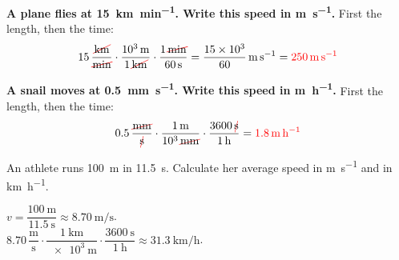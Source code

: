 \begin{example}
    \textbf{A plane flies at \qty{15}{\km\per\minute}. Write this speed in \unit{\m\per\s}.} First the length, then the time:
    \begin{equation*}
        \num{15}\,\dfrac{\cancelunit{\km}}{\cancelunit{\minute}} \cdot \dfrac{\qty{e3}{\m}}{1\,\cancelunit{\km}} \cdot \dfrac{1\,\cancelunit{\minute}}{\qty{60}{\s}} = \dfrac{\num{15e3}}{60}\,\unit{\m\per\s} = \textcolor{red}{\qty{250}{\m\per\s}}
    \end{equation*}
\end{example}

\begin{example}
    \textbf{A snail moves at \qty{0.5}{\mm\per\s}. Write this speed in \unit{\m\per\hour}.} First the length, then the time:
    \begin{equation*}
        \num{0.5}\,\dfrac{\cancelunit{\mm}}{\cancelunit{\s}} \cdot \dfrac{\qty{1}{\m}}{\num{e3}\,\cancelunit{\mm}} \cdot \dfrac{\num{3600}\,\cancelunit{\s}}{\qty{1}{\hour}} = \textcolor{red}{\qty{1.8}{\m\per\hour}}
    \end{equation*}
\end{example}

\begin{exercise}
    An athlete runs \qty{100}{\metre} in \qty{11.5}{\s}. Calculate her average speed in \unit{\m\per\s} and in \unit{\km\per\hour}.
    \begin{solu}
        \(v = \dfrac{\qty{100}{\m}}{\qty{11.5}{\s}} \approx \qty{8.70}{\m\per\s}\). \\
        \(\num{8.70}\,\dfrac{\unit{\m}}{\unit{\s}} \cdot \dfrac{\qty{1}{\km}}{\qty{e3}{\m}} \cdot \dfrac{\qty{3600}{\s}}{\qty{1}{\hour}} \approx \qty{31.3}{\km\per\hour}\).
    \end{solu}
\end{exercise}

